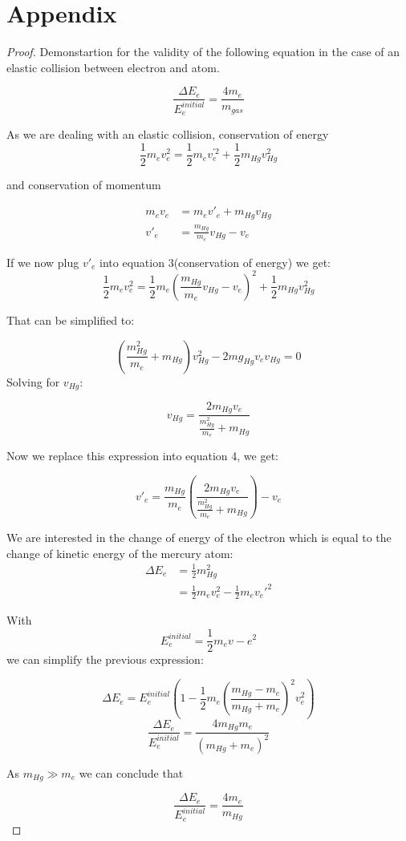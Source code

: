 \documentclass{scrartcl}
\begin{document}
\section{Appendix}
\begin{proof}
Demonstartion for the validity of the following equation in the case of an elastic collision between electron and atom.

\begin{equation}
    \frac{\Delta E_e}{E^{initial}_e} = \frac{4m_e}{m_{gas}}
\end{equation}

As we are dealing with an elastic collision, conservation of energy
\begin{equation}
    \frac{1}{2}m_ev_e^2 = \frac{1}{2}m_ev_e^{'2}+\frac{1}{2}m_{Hg}v_{Hg}^2
\end{equation}

and conservation of momentum 

\begin{align}
    m_ev_e &= m_ev'_e + m_{Hg}v_{Hg} \nonumber\\
    v'_e &= \frac{m_{Hg}}{m_e}v_{Hg} - v_e 
\end{align}

If we now plug $v'_e$ into equation 3(conservation of energy) we get:
$$\frac{1}{2}m_ev_e^2 = \frac{1}{2}m_e(\frac{m_{Hg}}{m_e}v_{Hg} - v_e)^2+\frac{1}{2}m_{Hg}v_{Hg}^2$$

That can be simplified to:

$$\left(\frac{m_{Hg}^2}{m_e}+m_{Hg} \right)v_{Hg}^2 -2mg_{Hg}v_ev_{Hg} = 0$$
Solving for $v_{Hg}$:

$$v_{Hg} = \frac{2m_{Hg}v_e}{\frac{m_{Hg}^2}{m_e}+m_{Hg}}$$

Now we replace this expression into equation 4, we get:

$$v'_e = \frac{m_{Hg}}{m_e}\left(\frac{2m_{Hg}v_e} {\frac{m_{Hg}^2}{m_e}+m_{Hg}} \right) - v_e$$

We are interested in the change of energy of the electron which is equal to the change of kinetic energy of the mercury atom:
\begin{align}
    \Delta E_e &=  \frac{1}{2}m_{Hg}^2 \nonumber \\
    &= \frac{1}{2}m_e v_e ^2-\frac{1}{2}m_e v_e'^2 \nonumber
\end{align}

With $$E_e^{initial} = \frac{1}{2}m_ev-e^2$$ we can simplify the previous expression:

\[\Delta E_e = E_e^{initial} \left(1-\frac{1}{2}m_e \left(\frac{m_{Hg}-m_e}{m_{Hg}+m_e}\right)^2 v_e^2 \right)\]
\[\frac{\Delta E_e}{E_e^{initial}} = \frac{4m_{Hg}m_e}{\left(m_{Hg}+m_e \right)^2}\nonumber \]

As $m_{Hg} \gg m_e$ we can conclude that


\[\frac{\Delta E_e}{E_e^{initial}} = \frac{4m_e}{m_{Hg}}\]
\end{proof}
\end{document}
